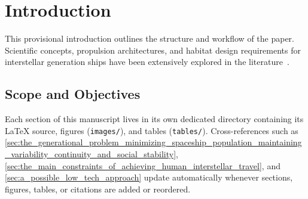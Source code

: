\section{Introduction}
\label{sec:introduction}

This provisional introduction outlines the structure and workflow of the paper.
Scientific concepts, propulsion architectures, and habitat design requirements
for interstellar generation ships have been extensively explored in the
literature~\cite{hein2012world,smith2014star}.

\subsection{Scope and Objectives}
\label{subsec:scope}

Each section of this manuscript lives in its own dedicated directory containing
its LaTeX source, figures (\texttt{images/}), and tables (\texttt{tables/}).
Cross-references such as \cref{sec:the_generational_problem_minimizing_spaceship_population_maintaining_variability_continuity_and_social_stability},
\cref{sec:the_main_constraints_of_achieving_human_interstellar_travel}, and
\cref{sec:a_possible_low_tech_approach} update automatically whenever sections,
figures, tables, or citations are added or reordered.
